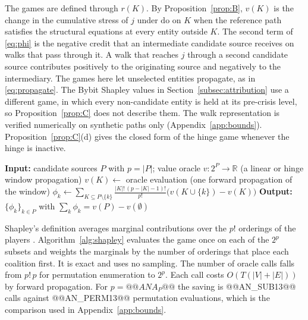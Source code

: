 \documentclass[referee,pdflatex,sn-mathphys-ay]{sn-jnl}
\theoremstyle{thmstyleone}%
\theoremstyle{thmstyletwo}%
\theoremstyle{thmstylethree}%
\newcommand{\doop}{\mathrm{do}}
\begin{document}
The games are defined through $r(K)$. By Proposition~\ref{prop:B}, $v(K)$ is the change in the
cumulative stress of $j$ under $\doop$ on $K$ when the reference path satisfies the structural
equations at every entity outside $K$.
The second term of \eqref{eq:phi} is the negative credit that an intermediate candidate
source receives on walks that pass through it. A walk that reaches $j$ through a second
candidate source contributes positively to the originating source and negatively to the
intermediary. The games here let unselected entities propagate, as in \eqref{eq:propagate}.
The Bybit Shapley values in Section~\ref{subsec:attribution} use a different game, in which every
non-candidate entity is held at its pre-crisis level, so Proposition~\ref{prop:C} does not
describe them. The walk representation is verified numerically on synthetic paths only
(Appendix~\ref{app:bounds}). Proposition~\ref{prop:C}(d) gives the closed form of the hinge game whenever the hinge is inactive.

\begin{algorithm}[tbp]
\caption{Exact subset Shapley attribution}
\label{alg:shapley}
\begin{algorithmic}[1]
\State \textbf{Input:} candidate sources $P$ with $p=|P|$; value oracle $v:2^P\to\mathbb{R}$ (a linear or hinge window propagation)
  \State $v(K)\gets$ oracle evaluation (one forward propagation of the window)
\EndFor
{}
  \State $\phi_k \gets \sum_{K\subseteq P\setminus\{k\}}\frac{|K|!\,(p-|K|-1)!}{p!}\big(v(K\cup\{k\})-v(K)\big)$
\EndFor
\State \textbf{Output:} $\{\phi_k\}_{k\in P}$ with $\sum_k\phi_k=v(P)-v(\emptyset)$
\end{algorithmic}
\end{algorithm}

Shapley's definition averages marginal contributions over the $p!$ orderings of the players \citep{shapley1953value}. Algorithm~\ref{alg:shapley} evaluates the game once on each of the $2^p$ subsets and weights the marginals by the number of orderings that place each coalition first. It is exact and uses no sampling. The number of oracle
calls falls from $p!\,p$ for permutation enumeration to $2^p$. Each call costs
$O(T(|V|+|E|))$ by forward propagation. For $p=@@ANA_P@@$ the saving is @@AN_SUB13@@ calls against @@AN_PERM13@@ permutation
evaluations, which is the comparison used in Appendix~\ref{app:bounds}.
\end{document}
